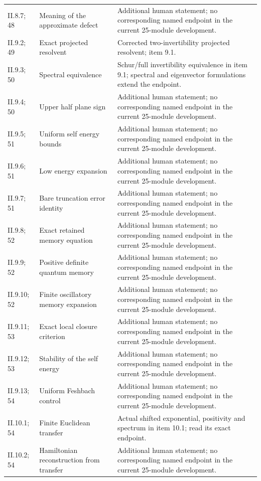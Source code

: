 \begin{longtable}{@{}p{.13\linewidth}p{.34\linewidth}p{.46\linewidth}@{}}
II.8.7; 48 & Meaning of the approximate defect & Additional human statement; no corresponding named endpoint in the current 25-module development.\\
II.9.2; 49 & Exact projected resolvent & Corrected two-invertibility projected resolvent; item 9.1.\\
II.9.3; 50 & Spectral equivalence & Schur/full invertibility equivalence in item 9.1; spectral and eigenvector formulations extend the endpoint.\\
II.9.4; 50 & Upper half plane sign & Additional human statement; no corresponding named endpoint in the current 25-module development.\\
II.9.5; 51 & Uniform self energy bounds & Additional human statement; no corresponding named endpoint in the current 25-module development.\\
II.9.6; 51 & Low energy expansion & Additional human statement; no corresponding named endpoint in the current 25-module development.\\
II.9.7; 51 & Bare truncation error identity & Additional human statement; no corresponding named endpoint in the current 25-module development.\\
II.9.8; 52 & Exact retained memory equation & Additional human statement; no corresponding named endpoint in the current 25-module development.\\
II.9.9; 52 & Positive definite quantum memory & Additional human statement; no corresponding named endpoint in the current 25-module development.\\
II.9.10; 52 & Finite oscillatory memory expansion & Additional human statement; no corresponding named endpoint in the current 25-module development.\\
II.9.11; 53 & Exact local closure criterion & Additional human statement; no corresponding named endpoint in the current 25-module development.\\
II.9.12; 53 & Stability of the self energy & Additional human statement; no corresponding named endpoint in the current 25-module development.\\
II.9.13; 54 & Uniform Feshbach control & Additional human statement; no corresponding named endpoint in the current 25-module development.\\
II.10.1; 54 & Finite Euclidean transfer & Actual shifted exponential, positivity and spectrum in item 10.1; read its exact endpoint.\\
II.10.2; 54 & Hamiltonian reconstruction from transfer & Additional human statement; no corresponding named endpoint in the current 25-module development.\\

\end{longtable}
